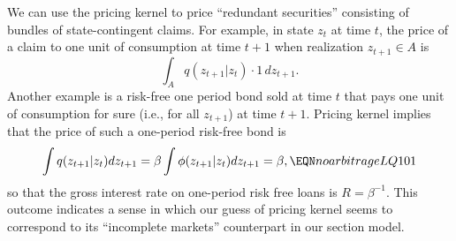 We can use  the pricing kernel to  price ``redundant securities'' consisting of   bundles of 
state-contingent claims. 
For example, in state $z_t $  at time $t$, the price  of a
claim to one unit of  consumption
at time $t+1$ when realization $z_{t+1} \in A$
is 
$$
\int_A  q(z_{t+1} | z_t ) \cdot 1 \, d  z_{t+1} .
$$ 
 Another example is a risk-free one period bond sold at time $t$ that  pays one unit of consumption for sure
  (i.e.,  for all $z_{t+1}$) at time $t+1$. %
Pricing kernel 
implies that the price of  such a   one-period risk-free bond is
$$ \int q(z_{t+1} | z_t) d z_{t+1} = \beta \int \phi(z_{t+1} | z_t) d z_{t+1} = \beta,  \EQN noarbitrageLQ101 $$
so that  the gross interest rate on one-period risk free loans is  $R=\beta^{-1}$. This outcome indicates a sense in which our guess of pricing kernel  seems to  
correspond to its ``incomplete markets'' counterpart  in our  section   model. 



